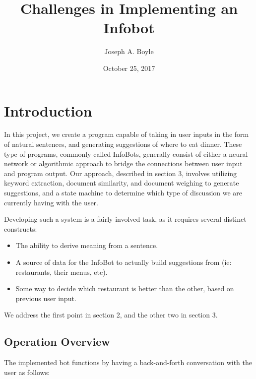 \documentclass{article}
\title{Challenges in Implementing an Infobot}
\author{Joseph A. Boyle}
\date{October 25, 2017}
\begin{document}
\maketitle

\section{Introduction}
    In this project, we create a program capable of taking in user inputs in the form of natural sentences, and generating suggestions of where to eat dinner. 
These type of programs, commonly called InfoBots, generally consist of either a neural network or algorithmic approach to bridge the connections between user 
input and program output. Our approach, described in section 3, involves utilizing keyword extraction, document similarity, and document weighing to generate 
suggestions, and a state machine to determine which type of discussion we are currently having with the user.
    
    Developing such a system is a fairly involved task, as it requires several distinct constructs:
    
    \begin{itemize}
        \item The ability to derive meaning from a sentence.
        \item A source of data for the InfoBot to actually build suggestions from (ie: restaurants, their menus, etc).
        \item Some way to decide which restaurant is better than the other, based on previous user input.
    \end{itemize}
    
    We address the first point in section 2, and the other two in section 3.
    
    \subsection{Operation Overview}
    The implemented bot functions by having a back-and-forth conversation with the user as follows:
    
\end{document}
